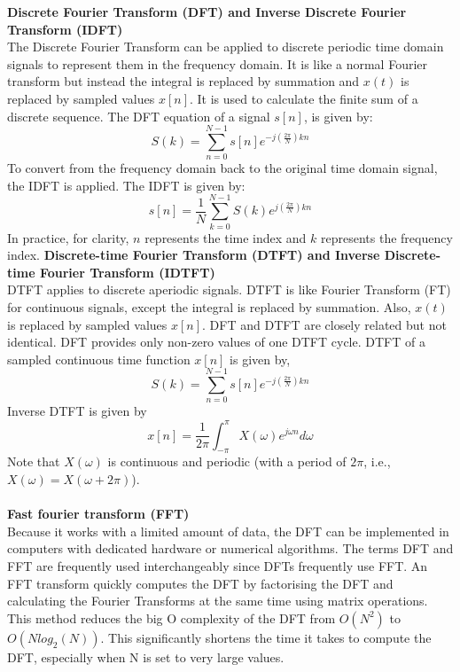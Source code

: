 \documentclass[12pt,a4paper]{article}
\begin{document}
\bigskip
\textbf{Discrete Fourier Transform (DFT) and Inverse Discrete Fourier Transform (IDFT)}\\
The Discrete Fourier Transform can be applied to discrete periodic time domain signals to represent them in the frequency domain. It is like a normal Fourier transform but instead the integral is replaced by summation and $x(t)$ is replaced by sampled values $x[n]$. It is used to calculate the finite sum of a discrete sequence.
The DFT equation of a signal $s[n]$, is given by:
$$
    S(k) = \sum^{N-1}_{n=0} s[n]e^{-j(\frac{2\pi}{N})kn}
$$
To convert from the frequency domain back to the original time domain signal, the IDFT is applied.
The IDFT is given by:
$$
    s[n] = \frac{1}{N}\sum^{N-1}_{k=0} S(k)e^{j(\frac{2\pi}{N})kn}
$$
In practice, for clarity, $n$ represents the time index and $k$ represents the frequency index.
\newpage
\vspace*{5mm}
\textbf{Discrete-time Fourier Transform (DTFT) and Inverse Discrete-time Fourier Transform (IDTFT)}\\
DTFT applies to discrete aperiodic signals. DTFT is like Fourier Transform (FT) for continuous signals, except the integral is replaced by summation. Also, $x(t)$ is replaced by sampled values $x[n]$. DFT and DTFT are closely related but not identical. DFT provides only non-zero values of one DTFT cycle.
DTFT of a sampled continuous time function $x[n]$ is given by,
$$
	S(k) = \sum^{N-1}_{n=0} s[n]e^{-j(\frac{2\pi}{N})kn}
$$
Inverse DTFT is given by\\
$$
    x[n] = \frac{1}{2\pi} \int^\pi_{-\pi} X(\omega)e^{j\omega n}d\omega
$$
Note that $X(\omega)$ is continuous and periodic (with a period of $2\pi$, i.e.,$X(\omega) = X(\omega + 2\pi)$).\\
\bigskip\\
\textbf{Fast fourier transform (FFT)}\\
Because it works with a limited amount of data, the DFT can be implemented in computers with dedicated hardware or numerical algorithms. The terms DFT and FFT are frequently used interchangeably since DFTs frequently use FFT.
An FFT transform quickly computes the DFT by factorising the DFT and calculating the Fourier Transforms at the same time using matrix operations. This method reduces the big O complexity of the DFT from $O(N^2)$ to $O(Nlog_2(N))$. This significantly shortens the time it takes to compute the DFT, especially when N is set to very large values.
\newpage
\vspace*{5mm}
\end{document}
